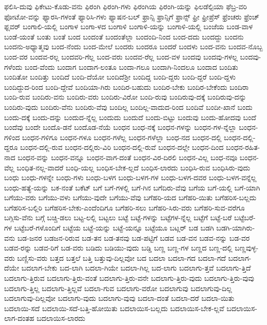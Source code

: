 {ಫಲಿಸಿ-ದುವು
ಫಿಕೇಟು-ಕೊಡು-ವನು
ಫಿರಂಗಿ
ಫಿರಂಗಿ-ಗಳು
ಫಿರಂಗಿಯ
ಫಿರಂಗಿ-ಯನ್ನು
ಫಿಲಡೆಲ್ಪಿಯಾ
ಫೆಬ್ರ-ವರಿ
ಫೋಟೋ-ವನ್ನು
ಫ್ಯಾರಸಿ-ಗಳಂತೆ
ಫ್ಯಾರಿಸಿ-ಗಳು
ಫ್ಯಾಷನ-ಬಲ್
ಫ್ರಾನ್ಸಿ
ಫ್ರಾನ್ಸಿಗೆ
ಫ್ರಾನ್ಸ್
ಫ್ರೀ
ಫ್ರೀಪ್ರೆಸ್
ಫ್ರೆಂಚರು
ಫ್ರೆಂಚ್
ಫ್ಲವರ್
ಬಂಗಾಲಿ-ಯಲ್ಲಿ
ಬಂಗಾಳ
ಬಂಗಾ-ಳದ
ಬಂಗಾಳಿ
ಬಂಗಾಳಿ-ಯನ್ನು
ಬಂಗಾಳಿ-ಯಲ್ಲಿ
ಬಂಜೆಯ
ಬಂಡ-ವಾಳ
ಬಂಡೆ-ಯಂತೆ
ಬಂತು
ಬಂತೆ
ಬಂದ
ಬಂದಂತೆ
ಬಂದಂತೆಲ್ಲಾ
ಬಂದಂದಿ-ನಿಂದ
ಬಂದ-ದದು
ಬಂದದ್ದು
ಬಂದನು
ಬಂದನು-ಅಧ್ಯಾತ್ಮವು
ಬಂದ-ನೆಂದು
ಬಂದ-ಮೇಲೆ
ಬಂದರು
ಬಂದರೂ
ಬಂದರೆ
ಬಂದಳು
ಬಂದ-ವನು
ಬಂದವ-ನೊಬ್ಬ
ಬಂದ-ವರ
ಬಂದವ-ರಲ್ಲ
ಬಂದವರಿ-ಗೆಲ್ಲ
ಬಂದ-ವರು
ಬಂದವ-ರೆಲ್ಲ
ಬಂದ-ವಳ
ಬಂದವು
ಬಂದವು-ಗಳಲ್ಲ
ಬಂದವು-ಗಳೆಂದು
ಬಂದ-ವೆಂದು
ಬಂದಾಗ
ಬಂದಾಗ-ಲಂತೂ
ಬಂದಾ-ಗಲೂ
ಬಂದಾಗಿ-ನಿಂದಲೂ
ಬಂದಾದ
ಬಂದಿತು
ಬಂದಿತೋ
ಬಂದಿತ್ತು
ಬಂದಿದೆ
ಬಂದಿ-ದೆಯೋ
ಬಂದಿದೆಶ್ರೀ
ಬಂದಿದ್ದ
ಬಂದಿ-ದ್ದರು
ಬಂದಿ-ದ್ದರೆ
ಬಂದಿ-ದ್ದಳು
ಬಂದಿದ್ದುದ-ರಿಂದ
ಬಂದಿ-ದ್ದೇವೆ
ಬಂದಿಯಾ-ಗಿರು
ಬಂದಿರ-ಬಹುದು
ಬಂದಿರ-ಬೇಕು
ಬಂದಿರ-ಬೇಕೆಂದು
ಬಂದಿರಾ
ಬಂದಿ-ರುವ
ಬಂದಿರು-ವನು
ಬಂದಿರು-ವರು
ಬಂದಿರು-ವಿರೋ
ಬಂದಿ-ರುವು
ಬಂದಿರುವು-ದಕ್ಕೆ
ಬಂದಿರುವು-ದನ್ನು
ಬಂದಿರು-ವುದು
ಬಂದಿರು-ವೆನು
ಬಂದಿರು-ವೆವು
ಬಂದಿಲ್ಲ
ಬಂದಿಲ್ಲ-ವಾದುದ-ರಿಂದ
ಬಂದಿವೆ
ಬಂದೀ-ಖಾನೆ
ಬಂದು
ಬಂದು-ದಕ್ಕೆ
ಬಂದು-ದನ್ನು
ಬಂದುದ-ನ್ನೆಲ್ಲ
ಬಂದುದು
ಬಂದುದೆ
ಬಂದು-ಬಿಟ್ಟು
ಬಂದುವು
ಬಂದು-ಹೋದವು
ಬಂದೆ
ಬಂದೆವು
ಬಂದೇ
ಬಂದೊ-ಡನೆ
ಬಂದೊಡ-ನೆಯೆ
ಬಂಧನ
ಬಂಧ-ನಕ್ಕೆ
ಬಂಧನ-ಗಳನ್ನು
ಬಂಧನ-ಗಳ-ನ್ನೆಲ್ಲಾ
ಬಂಧನ-ಗಳಿಂದ
ಬಂಧನ-ಗಳಿಗೂ
ಬಂಧನ-ಗಳೂ
ಬಂಧನ-ಗಳೆಲ್ಲ
ಬಂಧನ-ಗಳೆಲ್ಲಾ
ಬಂಧ-ನದ
ಬಂಧನ-ದಲ್ಲಿ
ಬಂಧನ-ದಲ್ಲಿ-ದ್ದರೂ
ಬಂಧನ-ದಲ್ಲಿ-ರುವ
ಬಂಧನ-ದಲ್ಲಿರು-ವಿರಿ
ಬಂಧನ-ದಲ್ಲಿ-ರುವೆ
ಬಂಧನ-ದಲ್ಲೇ
ಬಂಧನ-ದಿಂದ
ಬಂಧನ-ರಹಿತ-ನಾದ
ಬಂಧನ-ವನ್ನು
ಬಂಧನ-ವನ್ನೂ
ಬಂಧನ-ವಾಗ-ದಂತೆ
ಬಂಧನ-ವಿರ-ದಿರಲಿ
ಬಂಧನ-ವಿಲ್ಲ
ಬಂಧ-ನವೂ
ಬಂಧನ-ವೆಲ್ಲ
ಬಂಧಿತ-ನಲ್ಲ-ವಾದರೆ
ಬಂಧಿ-ಯಲ್ಲ
ಬಂಧಿಸ-ಬೇಕ-ಲ್ಲದೆ
ಬಂಧಿಸ-ಲಾರದು
ಬಂಧಿಸಿ-ರುವ
ಬಂಧಿಸಿರು-ವುದು
ಬಂಧು
ಬಂಧು-ಗಳನ್ನೇ
ಬಂಧು-ಗಳು
ಬಂಧು-ಬಳಗ
ಬಂಧು-ಬಳಗ-ಗಳ
ಬಂಧು-ಬಳಗ-ದವರ
ಬಂಧು-ಬಳಗ-ವನ್ನೆಲ್ಲ
ಬಂಧು-ಹತ್ಯೆ-ಯನ್ನು
ಬಕ-ನಂತೆ
ಬಕೆಟ್
ಬಗೆ
ಬಗೆ-ಗಳಲ್ಲಿ
ಬಗೆ-ಗಿನ
ಬಗೆದಿರು-ವೆವು
ಬಗೆಯ
ಬಗೆ-ಯಲ್ಲಿ
ಬಗೆ-ಯಾಗಿ
ಬಗೆಯು-ವರು
ಬಗೆಯು-ವಳು
ಬಗೆಯು-ವುದೇ
ಬಗೆಯು-ವೆವು
ಬಗೆಹರಿ-ಯದ
ಬಗೆಹರಿ-ಯಿತು
ಬಗೆಹರಿಸ-ಬಲ್ಲದು
ಬಗೆಹರಿಸ-ಬಲ್ಲಿರಿ
ಬಗೆಹರಿಸ-ಬೇಕು-ಎಂದೆಂದಿಗೂ
ಬಗೆಹರಿ-ಸಲು
ಬಗೆಹರಿ-ಸಿರು-ವರು
ಬಗೆಹರಿ-ಸುವ-ವರೆಗೂ
ಬಗ್ಗಿಸು-ವೆನು
ಬಗ್ಗೆ
ಬಚ್ಚಿ-ಡಲು
ಬಟ್ಟ-ಲಲ್ಲಿ
ಬಟ್ಟಲು
ಬಟ್ಟೆ
ಬಟ್ಟೆ-ಗಳನ್ನು
ಬಟ್ಟೆಗಳ-ನ್ನೆಲ್ಲ
ಬಟ್ಟೆಗೆ
ಬಟ್ಟೆ-ಬರೆ
ಬಟ್ಟೆಬರೆ-ಗಳ
ಬಟ್ಟೆಬರೆ-ಗಳೊಂದಿಗೆ
ಬಟ್ಟೆಯ
ಬಟ್ಟೆ-ಯನ್ನು
ಬಟ್ಟೆ-ಯನ್ನೂ
ಬಟ್ಟೆಯೂ
ಬಟ್ಲರ್
ಬಡ
ಬಡಗಿ
ಬಡಗಿ-ಯಾಗಿರು-ವನು
ಬಡ-ಜನರ
ಬಡಜನ-ರಿರುವ
ಬಡ-ತನ
ಬಡ-ತನವು
ಬಡ-ಪಟ್ಟಿಗೆ
ಬಡವ
ಬಡ-ವನ
ಬಡವ-ನನ್ನು
ಬಡ-ವರ
ಬಡವ-ರನ್ನು
ಬಡವ-ರಿಗೆ
ಬಡ-ವರು
ಬಡಿದು
ಬಡಿಯು-ವುದು
ಬಡ್ಡಿ
ಬಣ್ಣ
ಬಣ್ಣ-ಗಳ
ಬಣ್ಣದ
ಬಣ್ಣ-ದಲ್ಲಿ
ಬಣ್ಣವುಳ್ಳ-ವರು
ಬಣ್ಣಿಸು-ವರು
ಬತ್ತದ
ಬತ್ತಲೆ
ಬತ್ತಿ
ಬತ್ತುವು-ದಿಲ್ಲವೋ
ಬದ
ಬದಲಾ
ಬದಲಾ-ಗದ
ಬದಲಾ-ಗದೆ
ಬದಲಾಗ-ದೆಯೇ
ಬದಲಾಗ-ಬೇಕು
ಬದ-ಲಾಗಿ
ಬದಲಾ-ಗಿಯೇ
ಬದಲಾ-ಗಿಲ್ಲ
ಬದ-ಲಾಗು
ಬದಲಾಗು-ತ್ತವೆ
ಬದಲಾಗು-ತ್ತಿದೆ
ಬದಲಾಗು-ತ್ತಿರುವ
ಬದಲಾಗು-ತ್ತಿರು-ವಂತೆ
ಬದಲಾಗು-ತ್ತಿರು-ವನೇ
ಬದಲಾಗು-ತ್ತಿರು-ವುದು
ಬದಲಾಗು-ತ್ತಿರು-ವುವು
ಬದಲಾಗು-ತ್ತಿಲ್ಲ
ಬದಲಾಗು-ತ್ತಿಲ್ಲವೆ
ಬದಲಾ-ಗುವ
ಬದಲಾಗು-ವರೋ
ಬದಲಾಗುವು
ಬದಲಾಗುವು-ದಿಲ್ಲ
ಬದಲಾಗುವು-ದಿಲ್ಲವೋ
ಬದಲಾಗು-ವುದು
ಬದಲಾಗು-ವುವು
ಬದಲಾ-ದಂತೆ
ಬದಲಾ-ದರೆ
ಬದಲಾ-ಯಿತು
ಬದಲಾಯಿ-ಸದೆ
ಬದಲಾಯಿ-ಸದೆ-ಬತ್ತಿ-ಹೋಯಿತು
ಬದಲಾಯಿಸ-ಬಲ್ಲದು
ಬದಲಾಯಿಸ-ಬೇಕ-ಲ್ಲವೆ
ಬದಲಾಯಿಸ-ಲಾಗ-ದಂತಹ
ಬದಲಾಯಿಸ-ಲಾರದು
}
